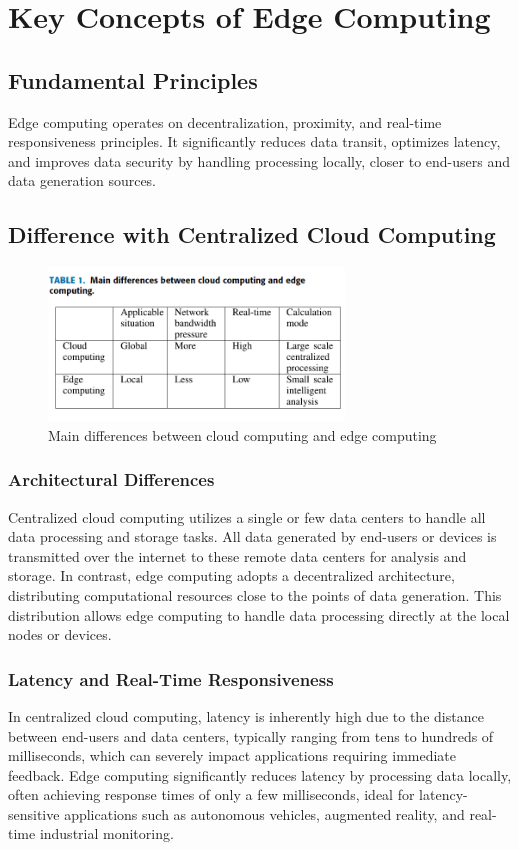 \documentclass[runningheads]{llncs}
\begin{document}
\section{Key Concepts of Edge Computing}
\subsection{Fundamental Principles}
Edge computing operates on decentralization, proximity, and real-time responsiveness principles. It significantly reduces data transit, optimizes latency, and improves data security by handling processing locally, closer to end-users and data generation sources.

\subsection{Difference with Centralized Cloud Computing}

\begin{figure}[ht]
    \centering
    \includegraphics[width=0.7\textwidth]{IMG/5.png}
    \caption{Main differences between cloud computing and edge computing}
    \label{fig:cloud_vs_edge}
    \end{figure}
    \FloatBarrier



\subsubsection{Architectural Differences}
Centralized cloud computing utilizes a single or few data centers to handle all data processing and storage tasks. All data generated by end-users or devices is transmitted over the internet to these remote data centers for analysis and storage. In contrast, edge computing adopts a decentralized architecture, distributing computational resources close to the points of data generation. This distribution allows edge computing to handle data processing directly at the local nodes or devices.

\subsubsection{Latency and Real-Time Responsiveness}
In centralized cloud computing, latency is inherently high due to the distance between end-users and data centers, typically ranging from tens to hundreds of milliseconds, which can severely impact applications requiring immediate feedback. Edge computing significantly reduces latency by processing data locally, often achieving response times of only a few milliseconds, ideal for latency-sensitive applications such as autonomous vehicles, augmented reality, and real-time industrial monitoring.
\end{document}
